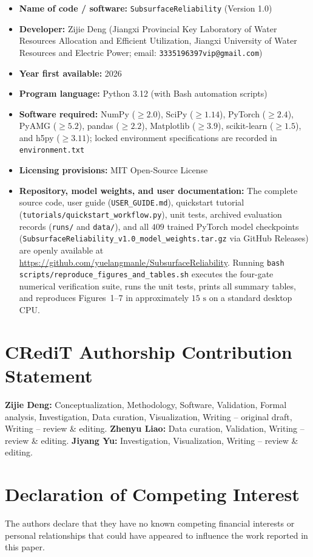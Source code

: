 \documentclass[preprint,12pt,authoryear]{elsarticle}
\begin{document}
\begin{itemize}
  \item \textbf{Name of code / software:} \texttt{SubsurfaceReliability} (Version 1.0)
  \item \textbf{Developer:} Zijie Deng (Jiangxi Provincial Key Laboratory of Water Resources Allocation and Efficient Utilization, Jiangxi University of Water Resources and Electric Power; email: \texttt{3335196397vip@gmail.com})
  \item \textbf{Year first available:} 2026
  \item \textbf{Program language:} Python 3.12 (with Bash automation scripts)
  \item \textbf{Software required:} NumPy ($\ge 2.0$), SciPy ($\ge 1.14$), PyTorch ($\ge 2.4$), PyAMG ($\ge 5.2$), pandas ($\ge 2.2$), Matplotlib ($\ge 3.9$), scikit-learn ($\ge 1.5$), and h5py ($\ge 3.11$); locked environment specifications are recorded in \texttt{environment.txt}
  \item \textbf{Licensing provisions:} MIT Open-Source License
  \item \textbf{Repository, model weights, and user documentation:} The complete source code, user guide (\texttt{USER\_GUIDE.md}), quickstart tutorial (\texttt{tutorials/quickstart\_workflow.py}), unit tests, archived evaluation records (\texttt{runs/} and \texttt{data/}), and all $409$ trained PyTorch model checkpoints (\texttt{SubsurfaceReliability\_v1.0\_model\_weights.tar.gz} via GitHub Releases) are openly available at \url{https://github.com/yuelangmanle/SubsurfaceReliability}. Running \texttt{bash scripts/reproduce\_figures\_and\_tables.sh} executes the four-gate numerical verification suite, runs the unit tests, prints all summary tables, and reproduces Figures~1--7 in approximately $15\text{ s}$ on a standard desktop CPU.
\end{itemize}

\section*{CRediT Authorship Contribution Statement}
\textbf{Zijie Deng:} Conceptualization, Methodology, Software, Validation, Formal analysis, Investigation, Data curation, Visualization, Writing -- original draft, Writing -- review \& editing. \textbf{Zhenyu Liao:} Data curation, Validation, Writing -- review \& editing. \textbf{Jiyang Yu:} Investigation, Visualization, Writing -- review \& editing.

\section*{Declaration of Competing Interest}
The authors declare that they have no known competing financial interests or personal relationships that could have appeared to influence the work reported in this paper.
\end{document}
